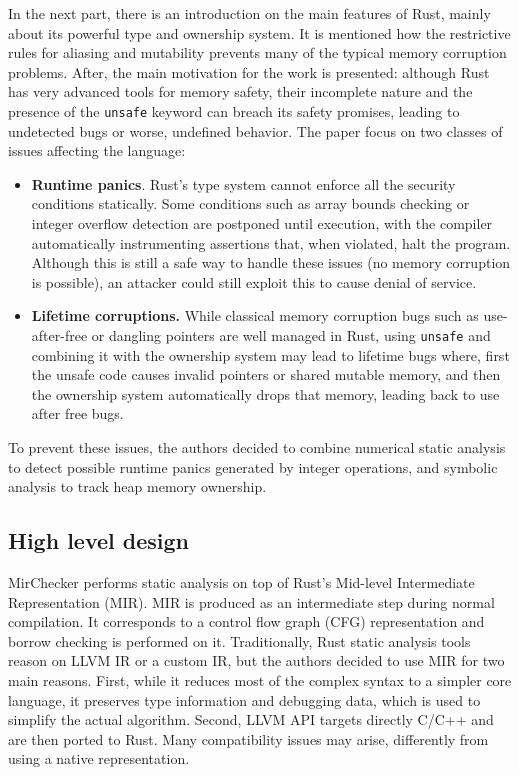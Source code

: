 \documentclass{article}
\begin{document}
In the next part, there is an introduction on the  main features of Rust, mainly about its 
powerful type and ownership system. It is mentioned how the restrictive rules for aliasing and mutability prevents many of the typical memory corruption problems. After, the main motivation for the work is presented: although 
Rust has very advanced tools for memory safety, their incomplete nature and the presence of the \texttt{unsafe} keyword  can breach its safety promises, leading  to undetected bugs or worse, undefined behavior. The paper focus on two 
classes of issues affecting the language: \begin{itemize}
    \item \textbf{Runtime panics}.  Rust's type system cannot enforce all the security conditions statically. Some conditions such as array bounds checking or integer overflow detection are postponed until execution, with 
    the compiler automatically instrumenting assertions that, when violated, halt the program. Although this is still a safe way to handle these issues (no memory corruption is possible), an attacker could still exploit this 
    to cause denial of service.
    \item \textbf{Lifetime corruptions.} While  classical memory corruption bugs such as use-after-free or dangling pointers are well managed in Rust, using \texttt{unsafe} and combining 
    it with the ownership system may lead to lifetime bugs where, first the unsafe code  causes invalid pointers or shared mutable memory, and then the ownership system automatically drops that memory, leading back to use after free bugs.
\end{itemize}
To prevent these issues, the authors decided to combine numerical static analysis to detect possible runtime panics generated by integer operations,
 and symbolic analysis to track heap memory ownership.
\subsection{High level design}
MirChecker performs static analysis on top of Rust's Mid-level Intermediate Representation (MIR). MIR is produced as an intermediate step during normal compilation. 
It corresponds to a control flow graph (CFG) representation  and borrow checking is performed on it. Traditionally, Rust static analysis tools reason on LLVM IR or  a custom IR, but the authors decided to use MIR 
for two main reasons. First, while it reduces most of the complex syntax to a simpler core language, it preserves type information and debugging data, which is used to simplify the actual algorithm.
Second, LLVM API targets directly C/C++ and are then ported to Rust. Many compatibility issues may arise, differently from using 
a native representation. 
\end{document}
